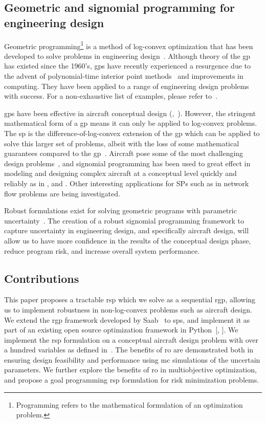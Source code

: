 \subsection{Geometric and signomial programming for engineering design}

Geometric programming\footnote{Programming refers to the mathematical formulation of an optimization problem.}
is a method of log-convex optimization that has been developed
to solve problems in engineering design~\cite{Duffin1967}. Although theory of the \gls{gp} has existed since
the 1960's, \gls{gp}s have recently experienced a resurgence due to the advent of polynomial-time
interior point methods~\cite{Nesterov1994} and improvements in computing. They have been
applied to a range of engineering design problems with success. For a non-exhaustive list of examples,
please refer to~\cite{Boyd2007}.

\gls{gp}s have been effective in aircraft conceptual design
(\cite{Hoburg2013},~\cite{Burton2018}).
However, the stringent mathematical form of a \gls{gp} means it can only be applied to log-convex problems.
The \gls{sp} is the difference-of-log-convex extension of the \gls{gp} which can be applied to
solve this larger set of problems, albeit with the loss of some mathematical guarantees compared to the \gls{gp}~\cite{Kirschen2018}.
Aircraft pose some of the most challenging design problems~\cite{York2018}, and signomial programming
has been used to great effect in modeling and designing complex aircraft at a conceptual level quickly
and reliably as in \cite{York2018}, \cite{Kirschen2018} and \cite{Kirschen2016}.
Other interesting applications for SPs such as in network flow problems are being investigated.

Robust formulations exist for solving geometric programs with parametric uncertainty~\cite{Saab2018}.
The creation of a robust signomial programming framework to capture uncertainty in engineering
design, and specifically aircraft design, will allow us to have more confidence in the results
of the conceptual design phase, reduce program risk, and increase overall system performance.

\subsection{Contributions}

This paper proposes a tractable \gls{rsp} which we solve as a sequential \gls{rgp},
allowing us to implement robustness in non-log-convex problems such as aircraft design.
We extend the \gls{rgp} framework developed by Saab~\cite{Saab2018} to \gls{sp}s, {\color{blue}and implement
it as part of an existing open source optimization framework in Python~[\cite{robust}, \cite{gpkit}]}.
We implement the \gls{rsp} formulation on a conceptual aircraft design problem with over a hundred
variables as defined in~\cite{Ozturk2018}.
The benefits of \gls{ro} are demonstrated both in ensuring design feasibility and performance
using \gls{mc} simulations of the uncertain parameters.
We further explore the benefits of \gls{ro} in multiobjective optimization, and propose
a goal programming \gls{rsp} formulation for risk minimization problems.


